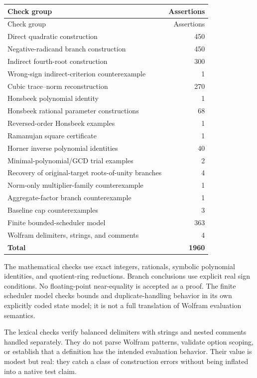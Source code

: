 \documentclass[11pt,letterpaper]{article}
\newcommand{\code}[1]{\texttt{\detokenize{#1}}}
\theoremstyle{definition}
\theoremstyle{remark}
\begin{document}
\begin{longtable}{@{}P{0.62\textwidth}r@{}}
\toprule Check group & Assertions\\\midrule\endfirsthead
\toprule Check group & Assertions\\\midrule\endhead
\bottomrule\endfoot
Direct quadratic construction & 450\\
Negative-radicand branch construction & 450\\
Indirect fourth-root construction & 300\\
Wrong-sign indirect-criterion counterexample & 1\\
Cubic trace--norm reconstruction & 270\\
Honsbeek polynomial identity & 1\\
Honsbeek rational parameter constructions & 68\\
Reversed-order Honsbeek examples & 1\\
Ramanujan square certificate & 1\\
Horner inverse polynomial identities & 40\\
Minimal-polynomial/GCD trial examples & 2\\
Recovery of original-target roots-of-unity branches & 4\\
Norm-only multiplier-family counterexample & 1\\
Aggregate-factor branch counterexample & 1\\
Baseline cap counterexamples & 3\\
Finite bounded-scheduler model & 363\\
Wolfram delimiters, strings, and comments & 4\\\midrule
\textbf{Total} & \textbf{1960}\\
\end{longtable}

The mathematical checks use exact integers, rationals, symbolic polynomial identities, and quotient-ring reductions. Branch conclusions use explicit real sign conditions. No floating-point near-equality is accepted as a proof. The finite scheduler model checks bounds and duplicate-handling behavior in its own explicitly coded state model; it is not a full translation of Wolfram evaluation semantics.

The lexical checks verify balanced delimiters with strings and nested comments handled separately. They do not parse Wolfram patterns, validate option scoping, or establish that a \code{SetDelayed} definition has the intended evaluation behavior. Their value is modest but real: they catch a class of construction errors without being inflated into a native test claim.
\end{document}
